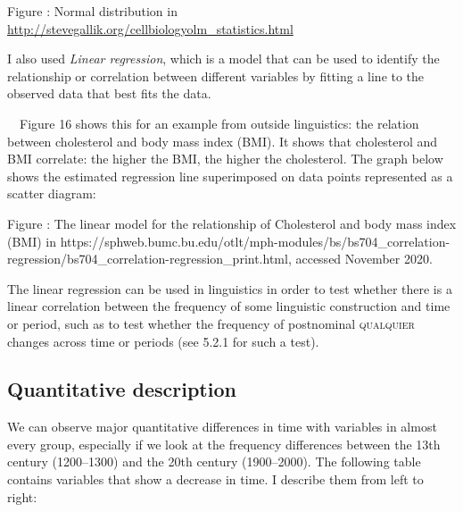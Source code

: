\begin{stylecaption}
\textmd{Figure : Normal distribution in }\url{http://stevegallik.org/cellbiologyolm_statistics.html}
\end{stylecaption}

\begin{styleStandard}
I also used \textit{Linear regression}, which is a model that can be used to identify the relationship or correlation between different variables by fitting a line to the observed data that best fits the data. 
\end{styleStandard}

\begin{styleStandard}
\ \ Figure 16 shows this for an example from outside linguistics: the relation between cholesterol and body mass index (BMI). It shows that cholesterol and BMI correlate: the higher the BMI, the higher the cholesterol. The graph below shows the estimated regression line superimposed on data points represented as a scatter diagram:
\end{styleStandard}

\begin{stylecaption}
\textmd{Figure : The linear model for the relationship of Cholesterol and body mass index (BMI) in https://sphweb.bumc.bu.edu/otlt/mph-modules/bs/bs704\_correlation-regression/bs704\_correlation-regression\_print.html, accessed November 2020.}
\end{stylecaption}

\begin{styleStandard}
The linear regression can be used in linguistics in order to test whether there is a linear correlation between the frequency of some linguistic construction and time or period, such as to test whether the frequency of postnominal \textsc{qualquier} changes across time or periods (see 5.2.1 for such a test).
\end{styleStandard}

\subsection[Quantitative description]{Quantitative description}
\begin{styleStandard}
We can observe major quantitative differences in time with variables in almost every group, especially if we look at the frequency differences between the 13th century (1200–1300) and the 20th century (1900–2000). The following table contains variables that show a decrease in time. I describe them from left to right: 
\end{styleStandard}

